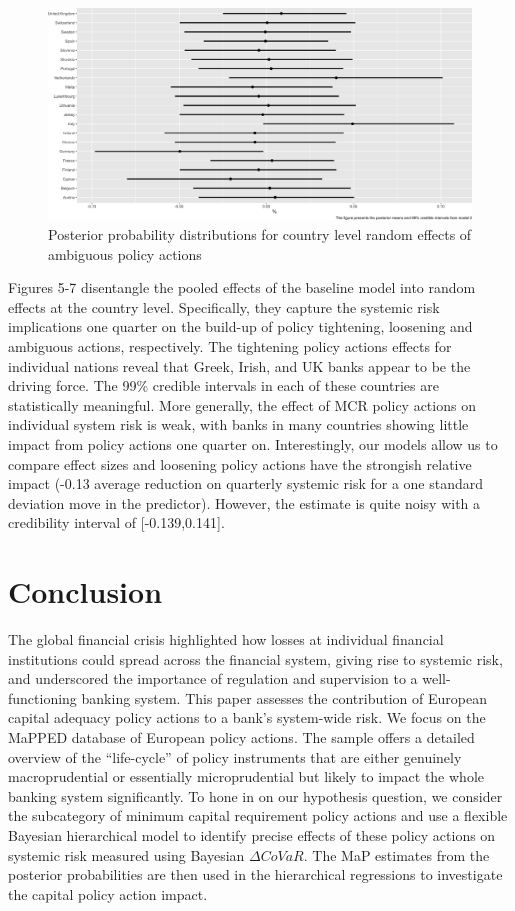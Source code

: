 \documentclass[
  10pt,
]{article}
\begin{document}
\begin{figure}
\centering
\includegraphics{figures/paper-fig7-1.png}
\caption{Posterior probability distributions for country level random
effects of ambiguous policy actions}
\end{figure}

Figures 5-7 disentangle the pooled effects of the baseline model into
random effects at the country level. Specifically, they capture the
systemic risk implications one quarter on the build-up of policy
tightening, loosening and ambiguous actions, respectively. The
tightening policy actions effects for individual nations reveal that
Greek, Irish, and UK banks appear to be the driving force. The 99\%
credible intervals in each of these countries are statistically
meaningful. More generally, the effect of MCR policy actions on
individual system risk is weak, with banks in many countries showing
little impact from policy actions one quarter on. Interestingly, our
models allow us to compare effect sizes and loosening policy actions
have the strongish relative impact (-0.13 average reduction on quarterly
systemic risk for a one standard deviation move in the predictor).
However, the estimate is quite noisy with a credibility interval of
{[}-0.139,0.141{]}.

\hypertarget{conclusion}{%
\section{Conclusion}\label{conclusion}}

The global financial crisis highlighted how losses at individual
financial institutions could spread across the financial system, giving
rise to systemic risk, and underscored the importance of regulation and
supervision to a well-functioning banking system. This paper assesses
the contribution of European capital adequacy policy actions to a bank's
system-wide risk. We focus on the MaPPED database of European policy
actions. The sample offers a detailed overview of the ``life-cycle'' of
policy instruments that are either genuinely macroprudential or
essentially microprudential but likely to impact the whole banking
system significantly. To hone in on our hypothesis question, we consider
the subcategory of minimum capital requirement policy actions and use a
flexible Bayesian hierarchical model to identify precise effects of
these policy actions on systemic risk measured using Bayesian
\(\Delta CoVaR\). The MaP estimates from the posterior probabilities are
then used in the hierarchical regressions to investigate the capital
policy action impact.
\end{document}
